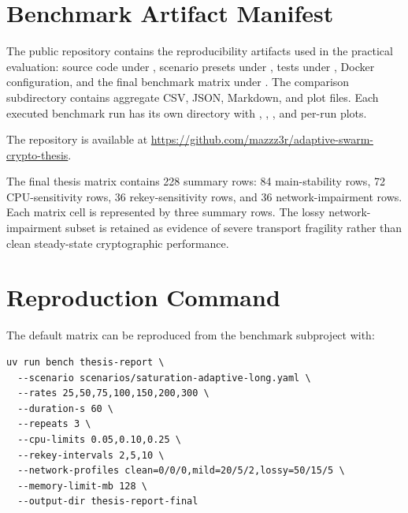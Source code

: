 \appendix
\chapter{Benchmark Artifact Manifest}

The public repository contains the reproducibility artifacts used in the
practical evaluation: source code under , scenario presets
under , tests under , Docker
configuration, and the final benchmark matrix under
. The comparison subdirectory contains
aggregate CSV, JSON, Markdown, and plot files. Each executed benchmark run has
its own directory with , ,
, and per-run plots.

The repository is available at
\url{https://github.com/mazzz3r/adaptive-swarm-crypto-thesis}.

The final thesis matrix contains 228 summary rows: 84 main-stability rows,
72 CPU-sensitivity rows, 36 rekey-sensitivity rows, and 36 network-impairment
rows. Each matrix cell is represented by three summary rows. The lossy
network-impairment subset is retained as evidence of severe transport fragility
rather than clean steady-state cryptographic performance.

\chapter{Reproduction Command}

The default matrix can be reproduced from the benchmark subproject with:

\begin{lstlisting}
uv run bench thesis-report \
  --scenario scenarios/saturation-adaptive-long.yaml \
  --rates 25,50,75,100,150,200,300 \
  --duration-s 60 \
  --repeats 3 \
  --cpu-limits 0.05,0.10,0.25 \
  --rekey-intervals 2,5,10 \
  --network-profiles clean=0/0/0,mild=20/5/2,lossy=50/15/5 \
  --memory-limit-mb 128 \
  --output-dir thesis-report-final
\end{lstlisting}
